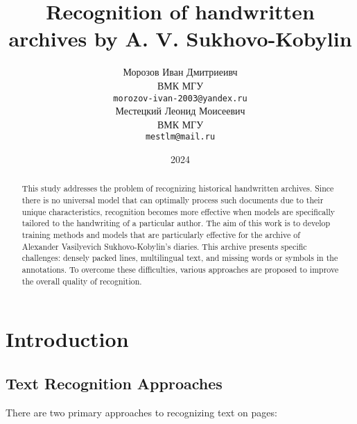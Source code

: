 \documentclass[12pt]{article}
\title{Recognition of handwritten archives by A. V. Sukhovo-Kobylin}
\author{ Морозов Иван Дмитриеивч \\
	ВМК МГУ\\
	\texttt{morozov-ivan-2003@yandex.ru} \\
	\And
	Местецкий Леонид Моисеевич \\
	ВМК МГУ \\
	\texttt{mestlm@mail.ru} \\
}
\date{2024}
\begin{document}
\maketitle
\begin{abstract}

This study addresses the problem of recognizing historical handwritten archives. Since there is no universal model that can optimally process such documents due to their unique characteristics, recognition becomes more effective when models are specifically tailored to the handwriting of a particular author. The aim of this work is to develop training methods and models that are particularly effective for the archive of Alexander Vasilyevich Sukhovo-Kobylin's diaries. This archive presents specific challenges: densely packed lines, multilingual text, and missing words or symbols in the annotations. To overcome these difficulties, various approaches are proposed to improve the overall quality of recognition.
\end{abstract}


\section{Introduction}
\subsection{Text Recognition Approaches}
There are two primary approaches to recognizing text on pages:
\end{document}
